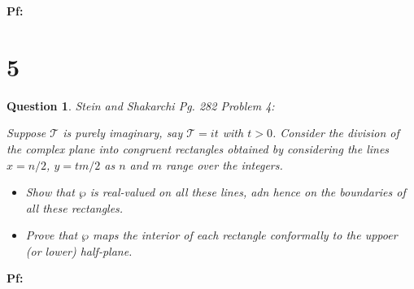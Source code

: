 \documentclass{article}
\newtheorem{question}{Question}
\begin{document}
\textbf{Pf:}

\break

\section*{5}
\begin{myBox}[]{}
    \begin{question}
        Stein and Shakarchi Pg. 282 Problem 4:

        Suppose $\mathcal{T}$ is purely imaginary, say $\mathcal{T}=it$ with $t>0$. 
        Consider the division of the complex plane into congruent rectangles obtained by considering the lines $x=n/2$, $y=tm/2$ as $n$ and $m$ range over the integers.
        \begin{itemize}
            \item[(a)] Show that $\wp$ is real-valued on all these lines, adn hence on the boundaries of all these rectangles.
            \item[(b)] Prove that $\wp$ maps the interior of each rectangle conformally to the uppoer (or lower) half-plane. 
        \end{itemize}
    \end{question}
\end{myBox}

\textbf{Pf:}
\end{document}
